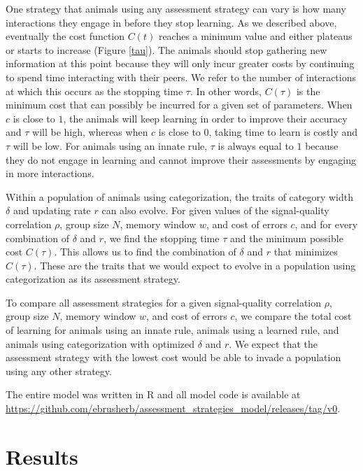 One strategy that animals using any assessment strategy can vary is how many interactions they engage in before they stop learning. As we described above, eventually the cost function $C(t)$ reaches a minimum value and either plateaus or starts to increase (Figure \ref{tau}). The animals should stop gathering new information at this point because they will only incur greater costs by continuing to spend time interacting with their peers. We refer to the number of interactions at which this occurs as the stopping time $\tau$. In other words, $C(\tau)$ is the minimum cost that can possibly be incurred for a given set of parameters. When $c$ is close to $1$, the animals will keep learning in order to improve their accuracy and $\tau$ will be high, whereas when $c$ is close to $0$, taking time to learn is costly and $\tau$ will be low. For animals using an innate rule, $\tau$ is always equal to $1$ because they do not engage in learning and cannot improve their assessments by engaging in more interactions. 

Within a population of animals using categorization, the traits of category width $\delta$ and updating rate $r$ can also evolve. For given values of the signal-quality correlation $\rho$,  group size $N$, memory window $w$, and cost of errors $c$, and for every combination of $\delta$ and $r$, we find the stopping time $\tau$ and the minimum possible cost $C(\tau)$. This allows us to find the combination of $\delta$ and $r$ that minimizes $C(\tau)$. These are the traits that we would expect to evolve in a population using categorization as its assessment strategy.  

To compare all assessment strategies for a given signal-quality correlation $\rho$, group size $N$, memory window $w$, and cost of errors $c$, we compare the total cost of learning for animals using an innate rule, animals using a learned rule, and animals using categorization with optimized $\delta$ and $r$. We expect that the assessment strategy with the lowest cost would be able to invade a population using any other strategy.

The entire model was written in R and all model code is available at \url{https://github.com/ebrusherb/assessment_strategies_model/releases/tag/v0}.

\section*{Results}

